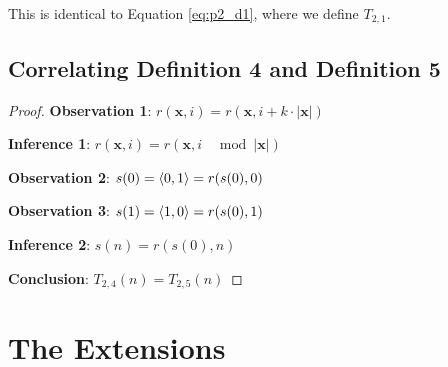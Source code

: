 \documentclass[conference]{IEEEtran}
\begin{document}
This is identical to Equation \ref{eq:p2_d1}, where we define $T_{2,1}$.

\subsection{Correlating Definition 4 and Definition 5}

\begin{proof}
\par\noindent\par
    \textbf{Observation 1}: $r(\textbf{x}, i) = r(\textbf{x}, i + k \cdot |\textbf{x}|)$

    \textbf{Inference 1}: $r(\textbf{x}, i) = r(\textbf{x}, i \;\; \mod{|\textbf{x}|})$

    \textbf{Observation 2}: $s(0) = \langle 0, 1 \rangle = r(s(0), 0)$

    \textbf{Observation 3}: $s(1) = \langle 1, 0 \rangle = r(s(0), 1)$

    \textbf{Inference 2}: $s(n) = r(s(0), n)$


    \textbf{Conclusion}: $T_{2,4}(n) = T_{2,5}(n)$
\end{proof}

\section{The Extensions}
\end{document}
